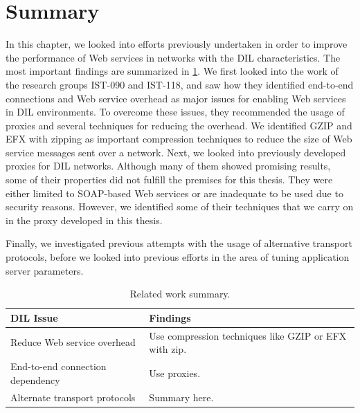 \section{Summary}

In this chapter, we looked into efforts previously undertaken in order to improve
the performance of Web services in networks with the DIL characteristics. The
most important findings are summarized in \cref{table:related-work-summary}. We
first looked into the work of the research groups IST-090 and IST-118, and saw
how they identified end-to-end connections and Web service overhead as major
issues for enabling Web services in DIL environments. To overcome these issues,
they recommended the usage of proxies and several techniques for reducing the
overhead. We identified GZIP and EFX with zipping as important compression
techniques to reduce the size of Web service messages sent over a network. Next,
we looked into previously developed proxies for DIL networks. Although many of
them showed promising results, some of their properties did not fulfill the
premises for this thesis. They were either limited to SOAP-based Web services or
are inadequate to be used due to security reasons. However, we identified some
of their techniques that we carry on in the proxy developed in this thesis.

Finally, we investigated previous attempts with the usage of alternative
transport protocols, before we looked into previous efforts in the area of
tuning application server parameters.

\begin{table}[h]
\begin{tabularx}{\textwidth}{| X | X |}
\hline
  \textbf{DIL Issue} & \textbf{Findings} \\ \hline

  Reduce Web service overhead  & Use compression techniques like GZIP or EFX
  with zip.\\ \hline

  End-to-end connection dependency & Use proxies. \\ \hline

  Alternate transport protocols & Summary here. \\ \hline
\end{tabularx}
\caption{Related work summary.}
\label{table:related-work-summary}
\end{table}
